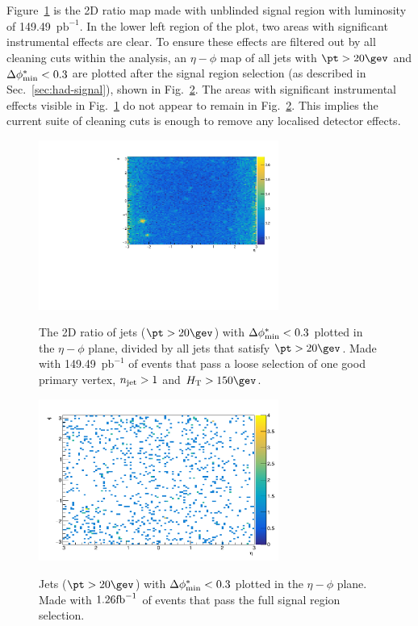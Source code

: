 Figure~\ref{fig:2dRatioMap} is the 2D ratio map made with unblinded signal region with luminosity of 
149.49~$\text{pb}^{-1}$. In the lower left region of the plot, two
areas with significant instrumental effects are clear. To ensure these
effects are filtered out by all cleaning cuts within the analysis, an
$\eta-\phi$ map of all jets with $\pt>20\gev$ and $\mbox{$\Delta\phi^{*}_{\rm min}$}<0.3$ are
plotted after the signal region selection (as described in
Sec.~\ref{sec:had-signal}), shown in
Fig.~\ref{fig:jetMapPostSignalSelection}. The areas with significant
instrumental effects visible in Fig.~\ref{fig:2dRatioMap} do not appear
to remain in Fig.~\ref{fig:jetMapPostSignalSelection}. This implies the current suite of cleaning cuts
is enough to remove any localised detector effects.

\begin{figure}[h!]
    \begin{center}
        {\includegraphics[width=0.7\textwidth]{figures/selection/EtaPhiMap.pdf}}
        \caption{The 2D ratio of jets ($\pt>20\gev$) with $\mbox{$\Delta\phi^{*}_{\rm min}$}<0.3$ plotted in the
        $\eta-\phi$ plane, divided by all jets that satisfy $\pt>20\gev$. 
        Made with 149.49~$\text{pb}^{-1}$ of
        events that pass a loose selection of one good primary vertex,
        $n_{\text{jet}}>1$ and $\scalht>150\gev$.}
        \label{fig:2dRatioMap}
    \end{center}
\end{figure}

\begin{figure}[h!]
    \begin{center}
        {\includegraphics[width=0.7\textwidth]{figures/selection/bDPhilt0p3AfterSelection.pdf}}
        \caption{Jets ($\pt>20\gev$) with $\mbox{$\Delta\phi^{*}_{\rm min}$}<0.3$ plotted in the
        $\eta-\phi$ plane. 
        Made with $1.26\text{fb}^{-1}$ of
        events that pass the full signal region selection.}
        \label{fig:jetMapPostSignalSelection}
    \end{center}
\end{figure}

